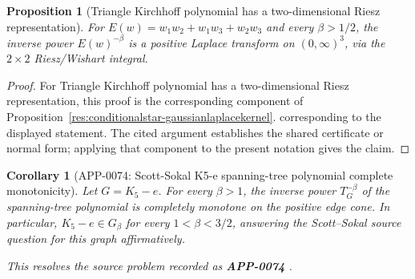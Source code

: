 \documentclass[11pt]{article}
\numberwithin{equation}{section}
\newtheorem{proposition}[theorem]{Proposition}
\newtheorem{corollary}[theorem]{Corollary}
\theoremstyle{definition}
\theoremstyle{remark}
\newcommand{\1}{\mathbf 1}
\begin{document}
\begin{proposition}[Triangle Kirchhoff polynomial has a two-dimensional Riesz representation]
\label{res:trianglekirchhoff-rieszlaplace-representation}
For \(E(w)=w_1w_2+w_1w_3+w_2w_3\) and every \(\beta>1/2\), the inverse power \(E(w)^{-\beta}\) is a positive Laplace transform on \((0,\infty)^3\), via the \(2\times2\) Riesz/Wishart integral.
\end{proposition}

\begin{proof}
For Triangle Kirchhoff polynomial has a two-dimensional Riesz representation, this proof is the corresponding component of Proposition~\ref{res:conditionalstar-gaussianlaplacekernel}.  corresponding to the displayed statement.  The cited argument establishes the shared certificate or normal form; applying that component to the present notation gives the claim.
\end{proof}

\begin{corollary}[APP-0074: Scott-Sokal K5-e spanning-tree polynomial complete monotonicity]
\label{res:k5minuse-spanningtreepolynomial-cm-betage1}
Let \(G=K_5-e\). For every \(\beta>1\), the inverse power \(T_G^{-\beta}\) of the spanning-tree polynomial is completely monotone on the positive edge cone. In particular, \(K_5-e\in G_\beta\) for every \(1<\beta<3/2\), answering the Scott--Sokal source question for this graph affirmatively.



This resolves the source problem recorded as \textbf{APP-0074} \cite{app-app-0074-source}.
\end{corollary}
\end{document}
